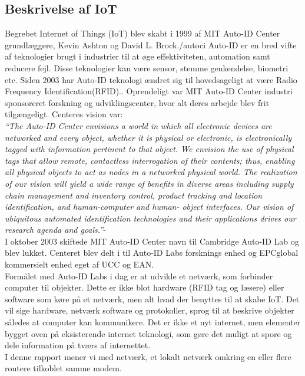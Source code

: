         \subsection{Beskrivelse af IoT}
        
        Begrebet Internet of Things (IoT) blev skabt i 1999 af MIT Auto-ID Center grundlæggere, Kevin Ashton og David L. Brock./autoci\autocite{Hashmi2017} Auto-ID er en bred vifte af teknologier brugt i industrier til at øge effektiviteten, automation samt reducere fejl. Disse teknologier kan være sensor, stemme genkendelse, biometri etc. Siden 2003 har Auto-ID teknologi ændret sig til hovedsageligt at være Radio Frequency Identification(RFID).\autocite{Sundmaeker2010}. Oprendeligt var MIT Auto-ID Center industri sponsoreret forskning og udviklingscenter, hvor alt deres arbejde blev frit tilgængeligt. Centeres vision var:\\
        \textit{``The Auto-ID Center envisions a world in which all electronic devices are networked and every object, whether it is physical or electronic, is electronically tagged with information pertinent to that object.  We envision the use of physical tags that allow remote, contactless interrogation of their contents; thus, enabling all physical objects to act as nodes in a networked physical world. The realization of our vision will yield a wide range of benefits in diverse areas including supply chain management and inventory control, product tracking and location identification, and human-computer and human- object interfaces. Our vision of ubiquitous automated identification technologies and their applications drives our research agenda and goals.''}- \autocite[Kapitel 2,p. ~4]{Sarma2001} \\
        I oktober 2003 skiftede MIT Auto-ID Center navn til Cambridge Auto-ID Lab og blev lukket. Centeret blev delt i til Auto-ID Labs forsknings enhed og EPCglobal kommersielt enhed eget af UCC og EAN.\autocite{Sundmaeker2010}
        \\Formålet med Auto-ID Labs i dag er at udvikle et netværk, som forbinder computer til objekter. Dette er ikke blot hardware (RFID tag og læsere) eller software som køre på et netværk, men alt hvad der benyttes til at skabe IoT. Det vil sige hardware, netværk software og protokoller, sprog til at beskrive objekter således at computer kan kommunikere. Det er ikke et nyt internet, men elementer bygget oven på eksisterende internet teknologi, som gøre det muligt at spore og dele information på tværs af internettet.\autocite{Sundmaeker2010} \\
        I denne rapport mener vi med netværk, et lokalt netværk omkring en eller flere routere tilkoblet samme modem.\\
        \\
  
